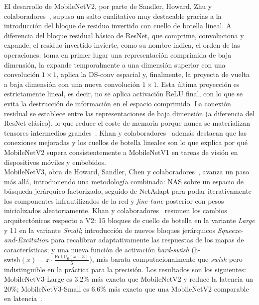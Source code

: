\documentclass[a4paper,12pt,twoside,final]{book}
\begin{document}
El desarrollo de MobileNetV2, por parte de Sandler, Howard, Zhu y colaboradores~\cite{sandler2018mobilenetv2}, supuso
un salto cualitativo muy destacable gracias a la introducción del bloque de residuo invertido con cuello de botella
lineal. A diferencia del bloque residual básico de ResNet, que comprime, convoluciona y expande, el residuo invertido
invierte, como su nombre indica, el orden de las operaciones: toma en primer lugar una representación comprimida de
baja dimensión, la expande temporalmente a una dimensión superior con una convolución $1\times 1$, aplica la DS-conv
espacial y, finalmente, la proyecta de vuelta a baja dimensión con una nueva convolución $1\times 1$. Esta última
proyección es estrictamente lineal, es decir, no se aplica activación ReLU final, con lo que se evita la destrucción
de información en el espacio comprimido. La conexión residual se establece entre las representaciones de baja
dimensión (a diferencia del ResNet clásico), lo que reduce el coste de memoria porque nunca se materializan tensores
intermedios grandes~\cite{sandler2018mobilenetv2}. Khan y colaboradores~\cite{khan2024scirep} además destacan que las
conexiones mejoradas y los cuellos de botella lineales son lo que explica por qué MobileNetV2 supera consistentemente
a MobileNetV1 en tareas de visión en dispositivos móviles y embebidos.\\

MobileNetV3, obra de Howard, Sandler, Chen y colaboradores~\cite{howard2019mobilenetv3}, avanza un paso más allá,
introduciendo una metodología combinada: NAS sobre un espacio de búsqueda jerárquico factorizado, seguido de NetAdapt
para podar iterativamente los componentes infrautilizados de la red y \textit{fine-tune} posterior con pesos
inicializados aleatoriamente. Khan y colaboradores~\cite{khan2024scirep} resumen los cambios arquitectónicos respecto
a V2: 15 bloques de cuello de botella en la variante \textit{Large} y 11 en la variante \textit{Small}; introducción
de nuevos bloques jerárquicos \textit{Squeeze-and-Excitation} para recalibrar adaptativamente las respuestas de los
mapas de características; y una nueva función de activación \textit{hard-swish}
(h-$\mathrm{swish}(x) = x \cdot \frac{\mathrm{ReLU}_6(x+3)}{6}$), más barata computacionalmente que \textit{swish}
pero indistinguible en la práctica para la precisión. Los resultados son los siguientes: MobileNetV3-Large es 3.2\%
más exacta que MobileNetV2 y reduce la latencia un 20\%; MobileNetV3-Small es 6.6\% más exacta que una MobileNetV2
comparable en latencia~\cite{howard2019mobilenetv3}.\\
\end{document}
